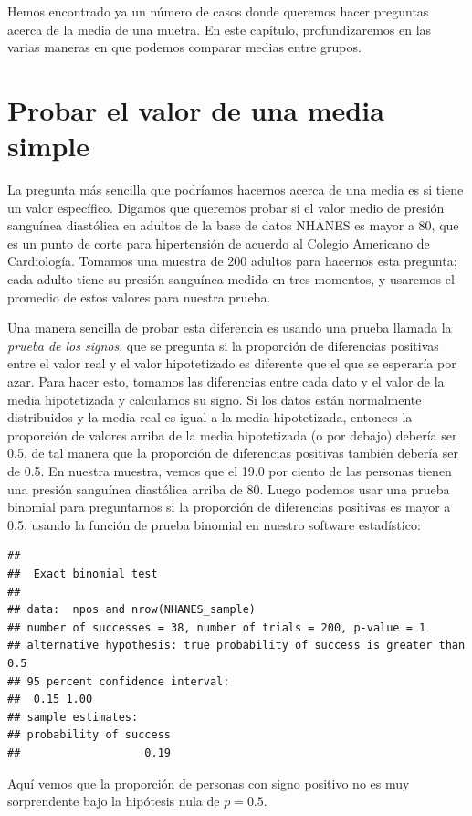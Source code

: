 \documentclass[
  12pt,
]{book}
\theoremstyle{definition}
\theoremstyle{definition}
\theoremstyle{definition}
\theoremstyle{remark}
\begin{document}
Hemos encontrado ya un número de casos donde queremos hacer preguntas acerca de la media de una muetra. En este capítulo, profundizaremos en las varias maneras en que podemos comparar medias entre grupos.

\hypertarget{single-mean}{%
\section{Probar el valor de una media simple}\label{single-mean}}

La pregunta más sencilla que podríamos hacernos acerca de una media es si tiene un valor específico. Digamos que queremos probar si el valor medio de presión sanguínea diastólica en adultos de la base de datos NHANES es mayor a 80, que es un punto de corte para hipertensión de acuerdo al Colegio Americano de Cardiología. Tomamos una muestra de 200 adultos para hacernos esta pregunta; cada adulto tiene su presión sanguínea medida en tres momentos, y usaremos el promedio de estos valores para nuestra prueba.

Una manera sencilla de probar esta diferencia es usando una prueba llamada la \emph{prueba de los signos}, que se pregunta si la proporción de diferencias positivas entre el valor real y el valor hipotetizado es diferente que el que se esperaría por azar. Para hacer esto, tomamos las diferencias entre cada dato y el valor de la media hipotetizada y calculamos su signo. Si los datos están normalmente distribuidos y la media real es igual a la media hipotetizada, entonces la proporción de valores arriba de la media hipotetizada (o por debajo) debería ser 0.5, de tal manera que la proporción de diferencias positivas también debería ser de 0.5. En nuestra muestra, vemos que el 19.0 por ciento de las personas tienen una presión sanguínea diastólica arriba de 80. Luego podemos usar una prueba binomial para preguntarnos si la proporción de diferencias positivas es mayor a 0.5, usando la función de prueba binomial en nuestro software estadístico:

\begin{verbatim}
## 
## 	Exact binomial test
## 
## data:  npos and nrow(NHANES_sample)
## number of successes = 38, number of trials = 200, p-value = 1
## alternative hypothesis: true probability of success is greater than 0.5
## 95 percent confidence interval:
##  0.15 1.00
## sample estimates:
## probability of success 
##                   0.19
\end{verbatim}

Aquí vemos que la proporción de personas con signo positivo no es muy sorprendente bajo la hipótesis nula de \(p=0.5\).
\end{document}
